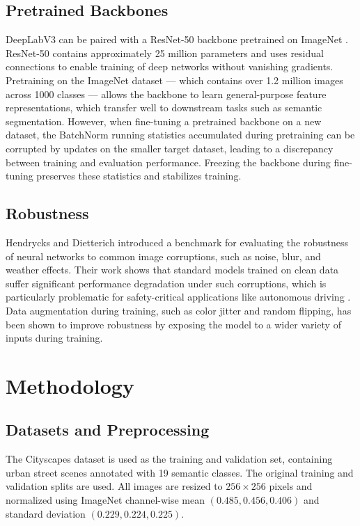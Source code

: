 \documentclass[conference]{IEEEtran}
\begin{document}
\subsection{Pretrained Backbones}
DeepLabV3 can be paired with a ResNet-50 backbone \cite{he2016resnet} pretrained on ImageNet \cite{russakovsky2015imagenet}. ResNet-50 contains approximately 25 million parameters and uses residual connections to enable training of deep networks without vanishing gradients. Pretraining on the ImageNet dataset — which contains over 1.2 million images across 1000 classes — allows the backbone to learn general-purpose feature representations, which transfer well to downstream tasks such as semantic segmentation. However, when fine-tuning a pretrained backbone on a new dataset, the BatchNorm running statistics accumulated during pretraining can be corrupted by updates on the smaller target dataset, leading to a discrepancy between training and evaluation performance. Freezing the backbone during fine-tuning preserves these statistics and stabilizes training.

\subsection{Robustness}
Hendrycks and Dietterich \cite{hendrycks2019robustness} introduced a benchmark for evaluating the robustness of neural networks to common image corruptions, such as noise, blur, and weather effects. Their work shows that standard models trained on clean data suffer significant performance degradation under such corruptions, which is particularly problematic for safety-critical applications like autonomous driving \cite{grigorescu2020survey}. Data augmentation during training, such as color jitter and random flipping, has been shown to improve robustness by exposing the model to a wider variety of inputs during training.


\section{Methodology}

\subsection{Datasets and Preprocessing}
The Cityscapes dataset \cite{cordts2016cityscapes} is used as the training and validation set, containing urban street scenes annotated with 19 semantic classes. The original training and validation splits are used. All images are resized to $256 \times 256$ pixels and normalized using ImageNet channel-wise mean $(0.485, 0.456, 0.406)$ and standard deviation $(0.229, 0.224, 0.225)$.
\end{document}
